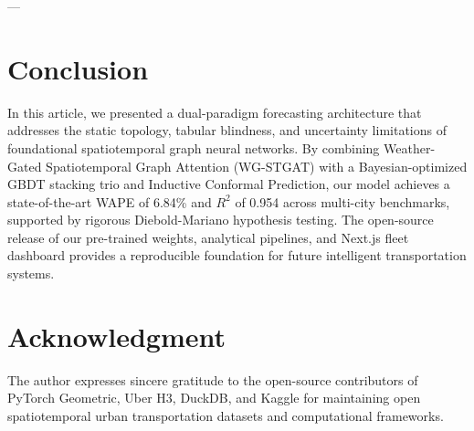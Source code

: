 \documentclass[10pt,journal,compsoc]{IEEEtran}
\begin{document}
---

\section{Conclusion}
In this article, we presented a dual-paradigm forecasting architecture that addresses the static topology, tabular blindness, and uncertainty limitations of foundational spatiotemporal graph neural networks. By combining Weather-Gated Spatiotemporal Graph Attention (WG-STGAT) with a Bayesian-optimized GBDT stacking trio and Inductive Conformal Prediction, our model achieves a state-of-the-art WAPE of 6.84\% and $R^2$ of 0.954 across multi-city benchmarks, supported by rigorous Diebold-Mariano hypothesis testing. The open-source release of our pre-trained weights, analytical pipelines, and Next.js fleet dashboard provides a reproducible foundation for future intelligent transportation systems.

\section*{Acknowledgment}
The author expresses sincere gratitude to the open-source contributors of PyTorch Geometric, Uber H3, DuckDB, and Kaggle for maintaining open spatiotemporal urban transportation datasets and computational frameworks.



\end{document}
